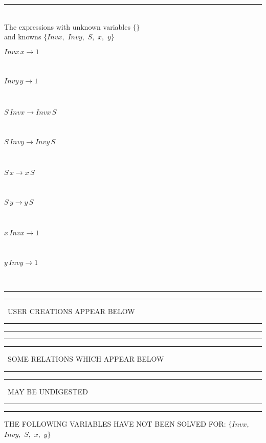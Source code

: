 \documentclass[rep10,leqno]{report}
\begin{document}
\rule[3pt]{6in}{.7pt}\\
The expressions with unknown variables $\{\}$\\
and knowns $\{Invx,
$ $
Invy,
$ $
S,
$ $
x,
$ $
y\}$\smallskip\\
\begin{minipage}{6in}
$
Invx\,
 x\rightarrow 1
$
\end{minipage}\medskip \\
\begin{minipage}{6in}
$
Invy\,
 y\rightarrow 1
$
\end{minipage}\medskip \\
\begin{minipage}{6in}
$
S\,
 Invx\rightarrow Invx\,
 S
$
\end{minipage}\medskip \\
\begin{minipage}{6in}
$
S\,
 Invy\rightarrow Invy\,
 S
$
\end{minipage}\medskip \\
\begin{minipage}{6in}
$
S\,
 x\rightarrow x\,
 S
$
\end{minipage}\medskip \\
\begin{minipage}{6in}
$
S\,
 y\rightarrow y\,
 S
$
\end{minipage}\medskip \\
\begin{minipage}{6in}
$
x\,
 Invx\rightarrow 1
$
\end{minipage}\medskip \\
\begin{minipage}{6in}
$
y\,
 Invy\rightarrow 1
$
\end{minipage}\\
\rule[2pt]{6in}{1pt}\hfil\break
\rule[2.5pt]{1.701in}{1pt}
\ USER CREATIONS APPEAR BELOW\ 
\rule[2.5pt]{1.701in}{1pt}\hfil\break
\rule[2pt]{6in}{1pt}\hfil\break
\rule[2pt]{6in}{4pt}\hfil\break
\rule[2pt]{1.45in}{4pt}
\ SOME RELATIONS WHICH APPEAR BELOW\ 
\rule[2pt]{1.45in}{4pt}\hfil\break
\rule[2pt]{2.18in}{4pt}
\ MAY BE UNDIGESTED\ 
\rule[2pt]{2.18in}{4pt}\hfil\break
\rule[2pt]{6in}{4pt}\hfil\break
THE FOLLOWING VARIABLES HAVE NOT BEEN SOLVED FOR:\hfil\break
$\{Invx,
$ $
Invy,
$ $
S,
$ $
x,
$ $
y\}$
\smallskip\\
\vspace{10pt}
\end{document}
